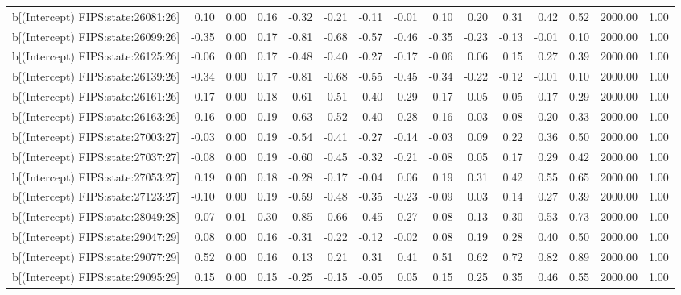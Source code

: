 \begin{table}[ht]
\begin{tabular}{rrrrrrrrrrrrrrr}
  b[(Intercept) FIPS:state:26081:26] & 0.10 & 0.00 & 0.16 & -0.32 & -0.21 & -0.11 & -0.01 & 0.10 & 0.20 & 0.31 & 0.42 & 0.52 & 2000.00 & 1.00 \\ 
  b[(Intercept) FIPS:state:26099:26] & -0.35 & 0.00 & 0.17 & -0.81 & -0.68 & -0.57 & -0.46 & -0.35 & -0.23 & -0.13 & -0.01 & 0.10 & 2000.00 & 1.00 \\ 
  b[(Intercept) FIPS:state:26125:26] & -0.06 & 0.00 & 0.17 & -0.48 & -0.40 & -0.27 & -0.17 & -0.06 & 0.06 & 0.15 & 0.27 & 0.39 & 2000.00 & 1.00 \\ 
  b[(Intercept) FIPS:state:26139:26] & -0.34 & 0.00 & 0.17 & -0.81 & -0.68 & -0.55 & -0.45 & -0.34 & -0.22 & -0.12 & -0.01 & 0.10 & 2000.00 & 1.00 \\ 
  b[(Intercept) FIPS:state:26161:26] & -0.17 & 0.00 & 0.18 & -0.61 & -0.51 & -0.40 & -0.29 & -0.17 & -0.05 & 0.05 & 0.17 & 0.29 & 2000.00 & 1.00 \\ 
  b[(Intercept) FIPS:state:26163:26] & -0.16 & 0.00 & 0.19 & -0.63 & -0.52 & -0.40 & -0.28 & -0.16 & -0.03 & 0.08 & 0.20 & 0.33 & 2000.00 & 1.00 \\ 
  b[(Intercept) FIPS:state:27003:27] & -0.03 & 0.00 & 0.19 & -0.54 & -0.41 & -0.27 & -0.14 & -0.03 & 0.09 & 0.22 & 0.36 & 0.50 & 2000.00 & 1.00 \\ 
  b[(Intercept) FIPS:state:27037:27] & -0.08 & 0.00 & 0.19 & -0.60 & -0.45 & -0.32 & -0.21 & -0.08 & 0.05 & 0.17 & 0.29 & 0.42 & 2000.00 & 1.00 \\ 
  b[(Intercept) FIPS:state:27053:27] & 0.19 & 0.00 & 0.18 & -0.28 & -0.17 & -0.04 & 0.06 & 0.19 & 0.31 & 0.42 & 0.55 & 0.65 & 2000.00 & 1.00 \\ 
  b[(Intercept) FIPS:state:27123:27] & -0.10 & 0.00 & 0.19 & -0.59 & -0.48 & -0.35 & -0.23 & -0.09 & 0.03 & 0.14 & 0.27 & 0.39 & 2000.00 & 1.00 \\ 
  b[(Intercept) FIPS:state:28049:28] & -0.07 & 0.01 & 0.30 & -0.85 & -0.66 & -0.45 & -0.27 & -0.08 & 0.13 & 0.30 & 0.53 & 0.73 & 2000.00 & 1.00 \\ 
  b[(Intercept) FIPS:state:29047:29] & 0.08 & 0.00 & 0.16 & -0.31 & -0.22 & -0.12 & -0.02 & 0.08 & 0.19 & 0.28 & 0.40 & 0.50 & 2000.00 & 1.00 \\ 
  b[(Intercept) FIPS:state:29077:29] & 0.52 & 0.00 & 0.16 & 0.13 & 0.21 & 0.31 & 0.41 & 0.51 & 0.62 & 0.72 & 0.82 & 0.89 & 2000.00 & 1.00 \\ 
  b[(Intercept) FIPS:state:29095:29] & 0.15 & 0.00 & 0.15 & -0.25 & -0.15 & -0.05 & 0.05 & 0.15 & 0.25 & 0.35 & 0.46 & 0.55 & 2000.00 & 1.00 \\ 

\end{tabular}
\end{table}
